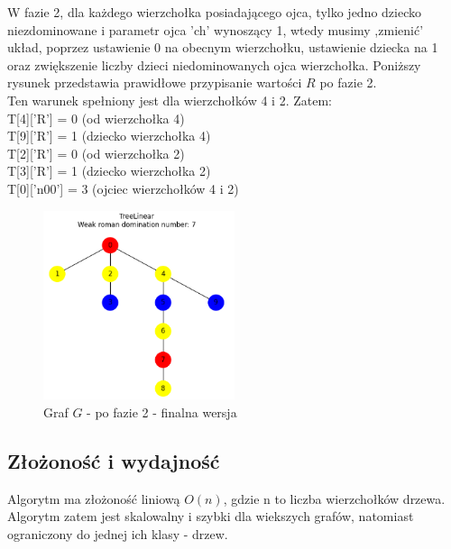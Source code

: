 W fazie 2, dla każdego wierzchołka posiadającego ojca, tylko jedno dziecko niezdominowane i parametr ojca 'ch' wynoszący 1, wtedy musimy ,zmienić' układ, poprzez ustawienie 0 na obecnym wierzchołku, ustawienie dziecka na 1 oraz zwiększenie liczby dzieci niedominowanych ojca wierzchołka. Poniższy rysunek przedstawia prawidłowe przypisanie wartości $R$ po fazie 2.\\
Ten warunek spełniony jest dla wierzchołków 4 i 2. Zatem:\\
T[4]['R'] = 0  (od wierzchołka 4)\\
T[9]['R'] = 1  (dziecko wierzchołka 4)\\
T[2]['R'] = 0  (od wierzchołka 2)\\
T[3]['R'] = 1  (dziecko wierzchołka 2)\\
T[0]['n00'] = 3  (ojciec wierzchołków 4 i 2)\\

\begin{figure}[H]
    \centering
    \includegraphics[width=0.5\textwidth]{assets/phase2.png}
    \caption{Graf $G$ - po fazie 2 - finalna wersja}
    \label{fig:drzewoFaza2}
\end{figure}

\subsection{Złożoność i wydajność}
Algorytm ma złożoność liniową $O(n)$, gdzie n to liczba wierzchołków drzewa. Algorytm zatem jest skalowalny i szybki dla wiekszych grafów, natomiast ograniczony do jednej ich klasy - drzew.

